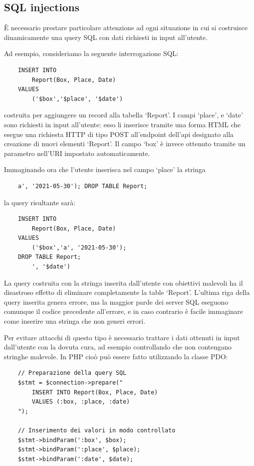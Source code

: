 \documentclass{article}
\begin{document}
\subsection{SQL injections}

È necessario prestare particolare attenzione ad ogni situazione in cui si costruisce dinamicamente una query SQL con dati richiesti in input all'utente.

Ad esempio, consideriamo la seguente interrogazione SQL:
\lstset{language=sql}
\begin{lstlisting}
    INSERT INTO
        Report(Box, Place, Date) 
    VALUES 
        ('$box','$place', '$date')
\end{lstlisting}
costruita per aggiungere un record alla tabella `Report'. I campi `\textdollar place', e `\textdollar date' sono richiesti in input all'utente: esso li inserisce tramite una forma HTML che esegue una richiesta HTTP di tipo POST all'endpoint dell'api designato alla creazione di nuovi elementi `Report'. Il campo `\textdollar box' è invece ottenuto tramite un parametro nell'URI impostato automaticamente.

Immaginando ora che l'utente inserisca nel campo `\textdollar place' la stringa
\begin{verbatim}
    a', '2021-05-30'); DROP TABLE Report;
\end{verbatim}
la query risultante sarà:
\lstset{language=sql, showstringspaces=false}
\begin{lstlisting}
    INSERT INTO
        Report(Box, Place, Date) 
    VALUES 
        ('$box','a', '2021-05-30'); 
    DROP TABLE Report;
        ', '$date')
\end{lstlisting}

La query costruita con la stringa inserita dall'utente con obiettivi malevoli ha il disastroso effetto di eliminare completamente la table `Report'. L'ultima riga della query inserita genera errore, ma la maggior parde dei server SQL eseguono comunque il codice precedente all'errore, e in caso contrario è facile immaginare come inserire una stringa che non generi errori.

Per evitare attacchi di questo tipo è necessario trattare i dati ottenuti in input dall'utente con la dovuta cura, ad esempio controllando che non contengano stringhe malevole. In PHP cioò può essere fatto utilizzando la classe PDO:
\lstset{language=php}
\begin{lstlisting}
    // Preparazione della query SQL
    $stmt = $connection->prepare("
        INSERT INTO Report(Box, Place, Date)
        VALUES (:box, :place, :date)
    ");

    // Inserimento dei valori in modo controllato
    $stmt->bindParam(':box', $box);
    $stmt->bindParam(':place', $place);
    $stmt->bindParam(':date', $date);    
\end{lstlisting}
\end{document}
